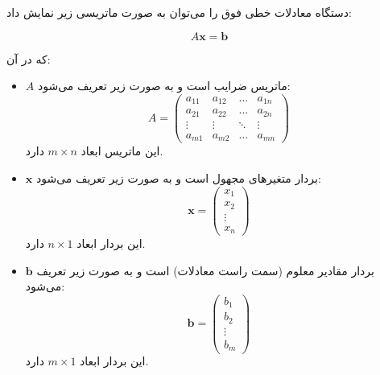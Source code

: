 \begin{definition}
	دستگاه معادلات خطی فوق را می‌توان به صورت ماتریسی زیر نمایش داد:
	
	\[
	A \mathbf{x} = \mathbf{b}
	\]
	
	که در آن:
	\begin{itemize}
		\item 
		\( A \) ماتریس ضرایب  است و به صورت زیر تعریف می‌شود:
		\[
		A = \begin{pmatrix}
			a_{11} & a_{12} & \dots & a_{1n} \\
			a_{21} & a_{22} & \dots & a_{2n} \\
			\vdots & \vdots & \ddots & \vdots \\
			a_{m1} & a_{m2} & \dots & a_{mn}
		\end{pmatrix}
		\]
		این ماتریس ابعاد \( m \times n \) دارد.
		
		\item 
		\( \mathbf{x} \) بردار متغیرهای مجهول است و به صورت زیر تعریف می‌شود:
		\[
		\mathbf{x} = \begin{pmatrix}
			x_1 \\
			x_2 \\
			\vdots \\
			x_n
		\end{pmatrix}
		\]
		این بردار ابعاد \( n \times 1 \) دارد.
		
		\item 
		\( \mathbf{b} \) بردار مقادیر معلوم (سمت راست معادلات) است و به صورت زیر تعریف می‌شود:
		\[
		\mathbf{b} = \begin{pmatrix}
			b_1 \\
			b_2 \\
			\vdots \\
			b_m
		\end{pmatrix}
		\]
		این بردار ابعاد \( m \times 1 \) دارد.
	\end{itemize}
 
\end{definition}	
